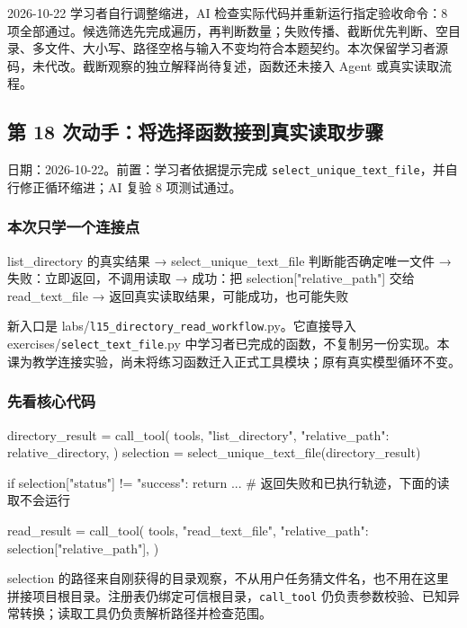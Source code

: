 \documentclass[UTF8,zihao=-4,fontset=fandol]{ctexart}
\begin{document}
2026-10-22 学习者自行调整缩进，AI 检查实际代码并重新运行指定验收命令：8 项全部通过。候选筛选先完成遍历，再判断数量；失败传播、截断优先判断、空目录、多文件、大小写、路径空格与输入不变均符合本题契约。本次保留学习者源码，未代改。截断观察的独立解释尚待复述，函数还未接入 Agent 或真实读取流程。

\subsection{第 18 次动手：将选择函数接到真实读取步骤}

日期：2026-10-22。前置：学习者依据提示完成 \nolinkurl{select_unique_text_file}，并自行修正循环缩进；AI 复验 8 项测试通过。

\subsubsection{本次只学一个连接点}

\begin{Code}
list_directory 的真实结果
  → select_unique_text_file 判断能否确定唯一文件
    → 失败：立即返回，不调用读取
    → 成功：把 selection["relative_path"] 交给 read_text_file
      → 返回真实读取结果，可能成功，也可能失败
\end{Code}

新入口是 labs/\nolinkurl{l15_directory_read_workflow}.py。它直接导入 exercises/\nolinkurl{select_text_file}.py 中学习者已完成的函数，不复制另一份实现。本课为教学连接实验，尚未将练习函数迁入正式工具模块；原有真实模型循环不变。

\subsubsection{先看核心代码}

\begin{Code}
directory_result = call_tool(
    tools, "list_directory", {"relative_path": relative_directory},
)
selection = select_unique_text_file(directory_result)

if selection["status"] != "success":
    return ...  # 返回失败和已执行轨迹，下面的读取不会运行

read_result = call_tool(
    tools, "read_text_file", {"relative_path": selection["relative_path"]},
)
\end{Code}

selection 的路径来自刚获得的目录观察，不从用户任务猜文件名，也不用在这里拼接项目根目录。注册表仍绑定可信根目录，\nolinkurl{call_tool} 仍负责参数校验、已知异常转换；读取工具仍负责解析路径并检查范围。
\end{document}
